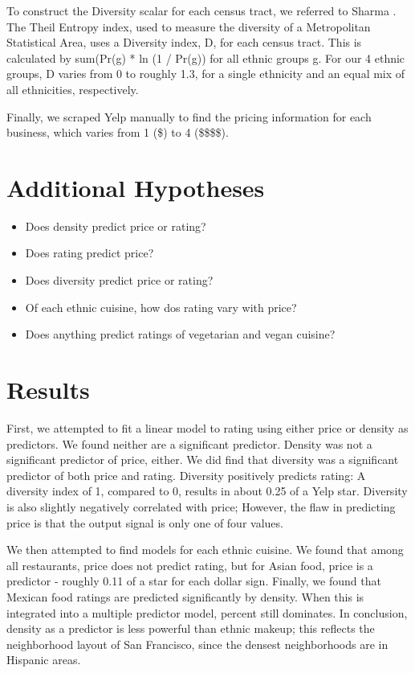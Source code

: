 \documentclass[11pt,twocolumn]{article}
\begin{document}
To construct the Diversity scalar for each census tract, we referred to Sharma \cite{tindex}. The Theil Entropy index, used to measure the diversity of a Metropolitan Statistical Area, uses a Diversity index, D, for each census tract. This is calculated by sum(Pr(g) * ln (1 / Pr(g)) for all ethnic groups g. For our 4 ethnic groups, D varies from 0 to roughly 1.3, for a single ethnicity and an equal mix of all ethnicities, respectively.

Finally, we scraped Yelp manually to find the pricing information for each business, which varies from 1 (\$) to 4 (\$\$\$\$).

\section{Additional Hypotheses}
\begin{itemize}
\item Does density predict price or rating?
\item Does rating predict price?
\item Does diversity predict price or rating?
\item Of each ethnic cuisine, how dos rating vary with price?
\item Does anything predict ratings of vegetarian and vegan cuisine?
\end{itemize}
\section{Results}

First, we attempted to fit a linear model to rating using either price or density as predictors. We found neither are a significant predictor. Density was not a significant predictor of price, either. We did find that diversity was a significant predictor of both price and rating. Diversity positively predicts rating: A diversity index of 1, compared to 0, results in about 0.25 of a Yelp star. Diversity is also slightly negatively correlated with price; However, the flaw in predicting price is that the output signal is only one of four values.

We then attempted to find models for each ethnic cuisine. We found that among all restaurants, price does not predict rating, but for Asian food, price is a predictor - roughly 0.11 of a star for each dollar sign. Finally, we found that Mexican food ratings are predicted significantly by density. When this is integrated into a multiple predictor model, percent still dominates. In conclusion, density as a predictor is less powerful than ethnic makeup; this reflects the neighborhood layout of San Francisco, since the densest neighborhoods are in Hispanic areas.
\end{document}
